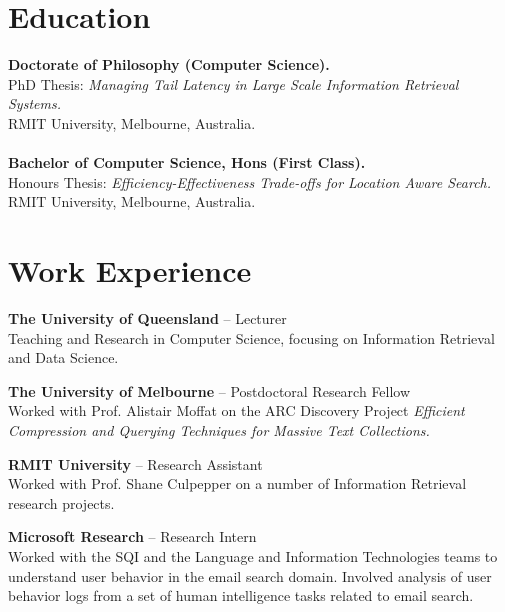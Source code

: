 \documentclass[line]{res}
\begin{document}
\address{\faMapMarker~}

\begin{resume}

\section{Education}{\bf Doctorate of Philosophy (Computer Science).}\hfill {}\\
                    PhD Thesis: {\emph{Managing Tail Latency in Large Scale Information Retrieval Systems.}}\\
                    RMIT University, Melbourne, Australia.\\\\
                    {\bf Bachelor of Computer Science, Hons (First Class).}\hfill {}\\
                    Honours Thesis: {\emph{Efficiency-Effectiveness Trade-offs for Location Aware Search.}}\\
                    RMIT University, Melbourne, Australia.
               

\section{Work Experience}
                    {\bf The University of Queensland} -- Lecturer\hfill {}\\
                    Teaching and Research in Computer Science, focusing on Information Retrieval and Data Science.

                    {\bf The University of Melbourne} -- Postdoctoral Research Fellow\hfill {}\\
                    Worked with Prof. Alistair Moffat on the ARC Discovery Project {\emph{Efficient Compression and Querying Techniques for Massive Text Collections.}}

                    {\bf RMIT University} -- Research Assistant\hfill {}\\
                    Worked with Prof. Shane Culpepper on a number of Information Retrieval research projects.

                    {\bf Microsoft Research} -- Research Intern\hfill {}\\
                    Worked with the SQI and the Language and Information Technologies teams to understand user behavior in the email search domain. Involved analysis of user behavior logs from a set of human intelligence tasks related to email search.
 

\end{resume}
\end{document}
